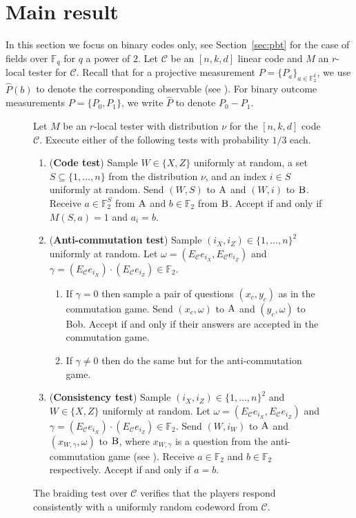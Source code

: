 \documentclass[11pt]{article}
\theoremstyle{definition}
\newcommand{\code}{\mathcal{C}}
\newcommand{\field}{\mathbb{F}_2}
\newcommand{\F}{\ensuremath{\mathbb{F}}}
\newcommand{\rand}{\textrm{rand}}
\newcommand{\labelstyle}[1]{\ensuremath{\textsc{#1}}\xspace}
\newcommand{\alice}{\labelstyle{A}}
\newcommand{\bob}{\labelstyle{B}}
\newenvironment{gamespec}{
  \begin{mdframed}[style=figstyle]}{
  \end{mdframed}}
\begin{document}
\section{Main result}

In this section we focus on binary codes only, see Section~\ref{sec:pbt} for the case of fields over $\F_q$ for $q$ a power of $2$. Let $\code$ be an $[n,k,d]$ linear code and $M$ an $r$-local tester for $\code$. Recall that for a projective measurement $P = \{P_a\}_{a \in \F_2^k}$, we use $\widehat{P}(b)$ to denote the corresponding observable (see ). For binary outcome measurements $P = \{ P_0, P_1\}$, we write $\widehat{P}$ to denote $P_0 - P_1$. 


\begin{figure}[!htbp]
  \centering
  \begin{gamespec}
Let $M$ be an $r$-local tester with distribution $\nu$ for the $[n,k,d]$ code $\code$.  Execute either of the following tests with probability $1/3$ each. 
    \begin{enumerate}
      \setlength\itemsep{1pt}
    \item (\textbf{Code test}) Sample $W\in \{X,Z\}$ uniformly at random, a set $S \subseteq \{1,\ldots,n\}$ from the distribution $\nu$, and an index $i \in S$ uniformly at random. 
    Send $(W,S)$ to $\alice$ and $(W,i)$ to $\bob$. Receive $a\in \field^S$ from $\alice$ and $b\in \field$ from $\bob$. Accept if and only if $M(S,a)=1$ and $a_i = b$.  
    \item (\textbf{Anti-commutation test}) Sample $(i_X,i_Z)\in \{1,\ldots,n\}^2 $ uniformly at random. Let $\omega = (E_\code e_{i_X}, E_\code e_{i_Z})$ and $\gamma =  (E_\code e_{i_X}) \cdot(E_\code e_{i_Z}) \in \field$. 
		\begin{enumerate} 
		\item If $\gamma=0$ then sample a pair of questions $(x_c,y_c)$ as in the commutation game. Send $(x_c,\omega)$ to $\alice$ and $(y_c,\omega)$ to Bob. Accept if and only if their answers are accepted in the commutation game. 
		\item If $\gamma\neq 0$ then do the same but for the anti-commutation game. 
		\end{enumerate} 
		 \item (\textbf{Consistency test}) Sample $(i_X,i_Z)\in \{1,\ldots,n\}^2 $ and $W\in \{X,Z\}$ uniformly at random. Let $\omega=(E_\code e_{i_X}, E_\code e_{i_Z})$ and $\gamma = (E_\code e_{i_X}) \cdot(E_\code e_{i_Z}) \in \field$. Send $(W,i_W)$ to $\alice$ and $(x_{W,\gamma},\omega)$ to $\bob$, where $x_{W,\gamma}$ is a question from the anti-commutation game (see ). Receive $a\in \field$ and $b\in \field$ respectively. Accept if and only if $a=b$. 
    \end{enumerate}
  \end{gamespec}
  \caption{The braiding test over $\code$ verifies that the players respond consistently with a uniformly random codeword from $\code$.}
  \label{fig:braiding-test}
\end{figure}
\end{document}
